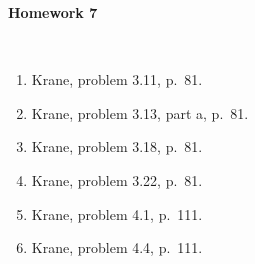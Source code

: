
\oddsidemargin=0in
\textwidth=6.75in

\renewcommand{\arraystretch}{1.3}


\pagestyle{empty}

\begin{center}
{\Large {\bf Homework 7}}
\end{center}
\hspace{1cm}\\

\begin{enumerate}


\item Krane, problem 3.11, p.~81.

\item Krane, problem 3.13, part a, p.~81.

\item Krane, problem 3.18, p.~81.

\item Krane, problem 3.22, p.~81.

\item Krane, problem 4.1, p.~111.

\item Krane, problem 4.4, p.~111.






\end{enumerate}





